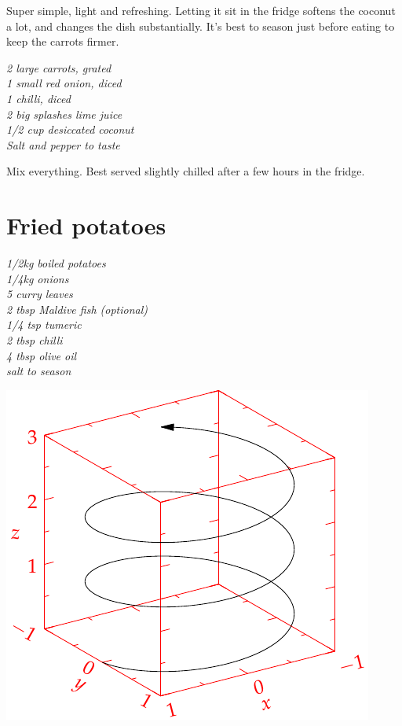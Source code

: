 \documentclass{tufte-book}
\begin{document}
Super simple, light and refreshing. Letting it sit in the fridge softens the coconut a lot, and changes the dish substantially. It's best to season just before eating to keep the carrots firmer.

\smallskip
\emph{2 large carrots, grated
\\1 small red onion, diced
\\1 chilli, diced
\\2 big splashes lime juice
\\1/2 cup desiccated coconut
\\Salt and pepper to taste}

\smallskip
Mix everything. Best served slightly chilled after a few hours in the fridge.



\section{Fried potatoes}
\emph{1/2kg boiled potatoes
\\1/4kg onions
\\5 curry leaves
\\2 tbsp Maldive fish (optional)
\\1/4 tsp tumeric
\\2 tbsp chilli
\\4 tbsp olive oil
\\salt to season
}

\begin{marginfigure}%
  \includegraphics[width=\linewidth]{helix}
\end{marginfigure}
\end{document}
